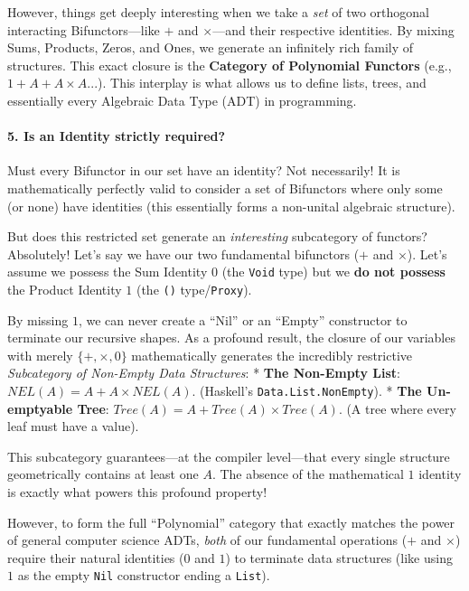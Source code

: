 \documentclass[
]{article}
\begin{document}
However, things get deeply interesting when we take a \emph{set} of two
orthogonal interacting Bifunctors---like \(+\) and \(\times\)---and
their respective identities. By mixing Sums, Products, Zeros, and Ones,
we generate an infinitely rich family of structures. This exact closure
is the \textbf{Category of Polynomial Functors} (e.g.,
\(1 + A + A \times A...\)). This interplay is what allows us to define
lists, trees, and essentially every Algebraic Data Type (ADT) in
programming.

\paragraph{5. Is an Identity strictly
required?}\label{is-an-identity-strictly-required}

Must every Bifunctor in our set have an identity? Not necessarily! It is
mathematically perfectly valid to consider a set of Bifunctors where
only some (or none) have identities (this essentially forms a non-unital
algebraic structure).

But does this restricted set generate an \emph{interesting} subcategory
of functors? Absolutely! Let's say we have our two fundamental
bifunctors (\(+\) and \(\times\)). Let's assume we possess the Sum
Identity \(0\) (the \texttt{Void} type) but we \textbf{do not possess}
the Product Identity \(1\) (the \texttt{()} type/\texttt{Proxy}).

By missing \(1\), we can never create a ``Nil'' or an ``Empty''
constructor to terminate our recursive shapes. As a profound result, the
closure of our variables with merely \(\{+, \times, 0\}\) mathematically
generates the incredibly restrictive \emph{Subcategory of Non-Empty Data
Structures}: * \textbf{The Non-Empty List}:
\(NEL(A) = A + A \times NEL(A)\). (Haskell's
\texttt{Data.List.NonEmpty}). * \textbf{The Un-emptyable Tree}:
\(Tree(A) = A + Tree(A) \times Tree(A)\). (A tree where every leaf must
have a value).

This subcategory guarantees---at the compiler level---that every single
structure geometrically contains at least one \(A\). The absence of the
mathematical \(1\) identity is exactly what powers this profound
property!

However, to form the full ``Polynomial'' category that exactly matches
the power of general computer science ADTs, \emph{both} of our
fundamental operations (\(+\) and \(\times\)) require their natural
identities (\(0\) and \(1\)) to terminate data structures (like using
\(1\) as the empty \texttt{Nil} constructor ending a \texttt{List}).
\end{document}
